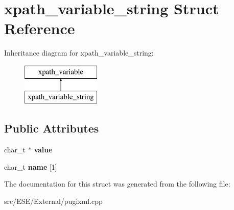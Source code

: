 \hypertarget{structxpath__variable__string}{\section{xpath\-\_\-variable\-\_\-string Struct Reference}
\label{structxpath__variable__string}
}
Inheritance diagram for xpath\-\_\-variable\-\_\-string\-:\begin{figure}[H]
\begin{center}
\leavevmode
\includegraphics[height=2.000000cm]{structxpath__variable__string}
\end{center}
\end{figure}
\subsection*{Public Attributes}
\begin{DoxyCompactItemize}
\item 
\hypertarget{structxpath__variable__string_aeb8a87a8457d2615cd7b766fd3f30559}{char\-\_\-t $\ast$ {\bfseries value}}\label{structxpath__variable__string_aeb8a87a8457d2615cd7b766fd3f30559}

\item 
\hypertarget{structxpath__variable__string_a5c43cdcc55a620db0e7bdd29b4d56e89}{char\-\_\-t {\bfseries name} \mbox{[}1\mbox{]}}\label{structxpath__variable__string_a5c43cdcc55a620db0e7bdd29b4d56e89}

\end{DoxyCompactItemize}


The documentation for this struct was generated from the following file\-:\begin{DoxyCompactItemize}
\item 
src/\-E\-S\-E/\-External/pugixml.\-cpp\end{DoxyCompactItemize}
